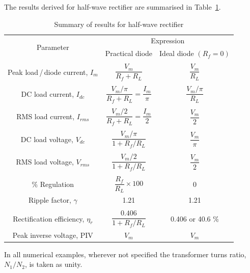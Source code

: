 The results derived for half-wave rectifier are summarised in Table~\ref{tab2.1}.
\begin{table}[H]
\caption{Summary of results for half-wave rectifier}\label{tab2.1}
\renewcommand{\arraystretch}{1.3}
\tabcolsep=9pt
\begin{tabular}{|c|c|c|}
\hline
\multirow{2}{1.5cm}{Parameter}\index{Half-wave rectifier!parameter} & \multicolumn{2}{c|}{Expression}\\\cline{2-3}
& Practical diode & Ideal diode $(R_f=0)$\\
\hline
&&\\[-14pt]
Peak load\,/\,diode current, $I_m$ & $\dfrac{V_m}{R_f + R_L}$ &
$\dfrac{V_m}{R_L}$\\[7pt]
\hline
&&\\[-14pt]
DC load current, $I_{dc}$ & $\dfrac{V_m/\pi}{R_f + R_L} =
\dfrac{I_m}{\pi}$ & $\dfrac{V_m/\pi}{R_L}$\\[7pt]
\hline
&&\\[-14pt]
RMS load current, $I_{rms}$ & $\dfrac{V_m/2}{R_f+R_L} =
\dfrac{I_m}{2}$  & $\dfrac{V_m}{2}$\\[7pt]
\hline
&&\\[-14pt]
DC load voltage, $V_{dc}$ & $\dfrac{V_m/\pi}{1+ R_{f}/R_L}$ &
$\dfrac{V_m}{\pi}$\\[7pt]
\hline
&&\\[-14pt]
RMS load voltage, $V_{rms}$ & $\dfrac{V_m /2}{1 + R_f / R_L}$ &
$\dfrac{V_m}{2}$\\[7pt]
\hline
&&\\[-14pt]
$\%$ Regulation & $\dfrac{R_f}{R_L} \times 100$ & 0\\[7pt]
\hline
Ripple factor, $\gamma$ & 1.21 & 1.21\\
\hline
&&\\[-14pt]
Rectification efficiency, $\eta_r$ & $\dfrac{0.406}{1+R_f /R_L}$ &
0.406  or 40.6 \% \\[7pt]
\hline
Peak inverse voltage, PIV & $V_m$ & $V_m$\\
\hline
\end{tabular}
\end{table}

In all numerical examples, wherever not specified the transformer
turns ratio, $N_1/N_2$, is taken as unity. 

\eject

